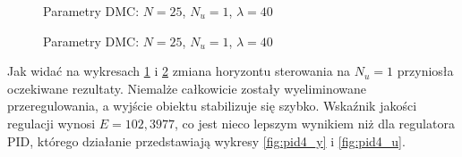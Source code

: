\begin{figure}[H]
\centering
{}
\caption{Parametry DMC: $N=25$, $N_u=1$, $\lambda=40$}
\label{fig:dmc4_y}
\end{figure}

\begin{figure}[H]
\centering
{}
\caption{Parametry DMC: $N=25$, $N_u=1$, $\lambda=40$}
\label{fig:dmc4_u}
\end{figure}

Jak widać na wykresach \ref{fig:dmc4_y} i \ref{fig:dmc4_u} zmiana horyzontu sterowania na $N_u=1$ przyniosła oczekiwane rezultaty. Niemalże całkowicie zostały wyeliminowane przeregulowania, a wyjście obiektu stabilizuje się szybko. Wskaźnik jakości regulacji wynosi $E=102,3977$, co jest nieco lepszym wynikiem niż dla regulatora PID, którego działanie przedstawiają wykresy \ref{fig:pid4_y} i \ref{fig:pid4_u}.
